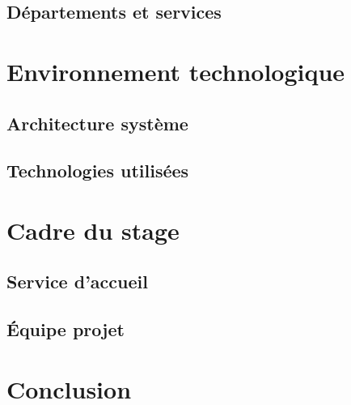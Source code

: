 \subsection{Départements et services}


\section{Environnement technologique}


\subsection{Architecture système}


\subsection{Technologies utilisées}


\section{Cadre du stage}


\subsection{Service d'accueil}


\subsection{Équipe projet}


\section{Conclusion}

